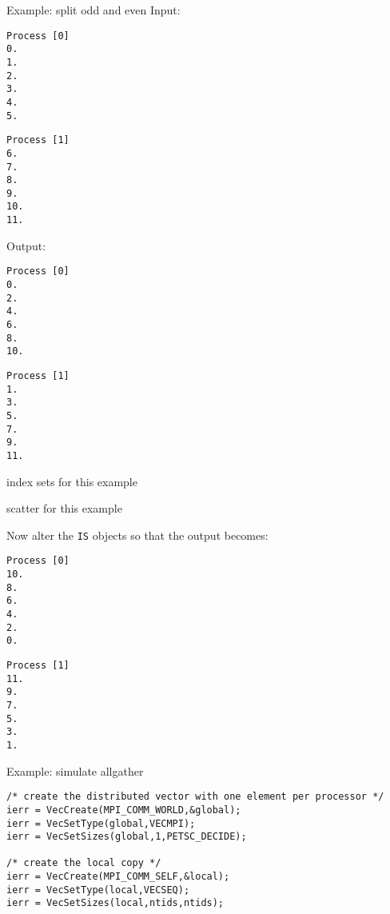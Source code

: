 \begin{numberedframe}{Example: split odd and even}
Input:
\begin{multicols}{2}
\tiny
\begin{verbatim}
Process [0]
0.
1.
2.
3.
4.
5.
\end{verbatim}
\begin{verbatim}
Process [1]
6.
7.
8.
9.
10.
11.
\end{verbatim}
\end{multicols}
Output:
\begin{multicols}{2}
\tiny
\begin{verbatim}
Process [0]
0.
2.
4.
6.
8.
10.
\end{verbatim}
\begin{verbatim}
Process [1]
1.
3.
5.
7.
9.
11.
\end{verbatim}
\end{multicols}
\end{numberedframe}

\begin{numberedframe}{index sets for this example}
\end{numberedframe}

\begin{numberedframe}{scatter for this example}
\end{numberedframe}

\begin{exerciseframe}[oddeven]
Now alter the \lstinline{IS} objects so that the output becomes:

\begin{multicols}{2}
\tiny
\begin{verbatim}
Process [0]
10.
8.
6.
4.
2.
0.
\end{verbatim}
\begin{verbatim}
Process [1]
11.
9.
7.
5.
3.
1.
\end{verbatim}
\end{multicols}
\end{exerciseframe}

\begin{numberedframe}{Example: simulate allgather}
\small
\begin{verbatim}
/* create the distributed vector with one element per processor */
ierr = VecCreate(MPI_COMM_WORLD,&global); 
ierr = VecSetType(global,VECMPI); 
ierr = VecSetSizes(global,1,PETSC_DECIDE); 

/* create the local copy */
ierr = VecCreate(MPI_COMM_SELF,&local); 
ierr = VecSetType(local,VECSEQ); 
ierr = VecSetSizes(local,ntids,ntids); 
\end{verbatim}
\end{numberedframe}


